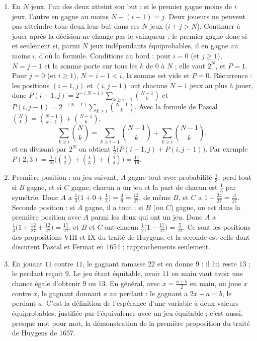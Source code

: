 \documentclass[11pt,a4paper]{article}
\begin{document}
\begin{solution}
\begin{enumerate}
\item En $N$ jeux, l'un des deux atteint son but : si le premier gagne moins de
  $i$ jeux, l'autre en gagne au moins $N - (i-1) = j$. Deux joueurs ne peuvent pas
  atteindre tous deux leur but dans ces $N$ jeux ($i + j > N$). Continuer à jouer
  après la décision ne change pas le vainqueur ; le premier gagne donc si et
  seulement si, parmi $N$ jeux indépendants équiprobables, il en gagne au moins
  $i$, d'où la formule. Conditions au bord : pour $i = 0$ (et $j \ge 1$),
  $N = j - 1$ et la somme porte sur tous les $k$ de $0$ à $N$ ; elle vaut $2^N$,
  et $P = 1$. Pour $j = 0$ (et $i \ge 1$), $N = i - 1 < i$, la somme est vide et
  $P = 0$. Récurrence : les positions $(i-1, j)$ et $(i, j-1)$ ont chacune
  $N - 1$ jeux au plus à jouer, donc
  $P(i-1,j) = 2^{-(N-1)}\sum_{k \ge i-1}\binom{N-1}{k}$ et
  $P(i,j-1) = 2^{-(N-1)}\sum_{k \ge i}\binom{N-1}{k}$. Avec la formule de Pascal
  $\binom{N}{k} = \binom{N-1}{k-1} + \binom{N-1}{k}$,
  \[
  \sum_{k \ge i}\binom{N}{k} = \sum_{k\ge i-1}\binom{N-1}{k} + \sum_{k \ge i}\binom{N-1}{k},
  \]
  et en divisant par $2^N$ on obtient $\frac12\bigl(P(i-1,j) + P(i,j-1)\bigr)$. Par
  exemple $P(2,3) = \frac{1}{16}\bigl(\binom42 + \binom43 + \binom44\bigr) =
  \frac{11}{16}$.
\item Première position : au jeu suivant, $A$ gagne tout avec probabilité
  $\frac13$, perd tout si $B$ gagne, et si $C$ gagne, chacun a un jeu et la part
  de chacun est $\frac13$ par symétrie. Donc $A$ a
  $\frac13\bigl(1 + 0 + \frac13\bigr) = \frac49 = \frac{12}{27}$, de même $B$, et
  $C$ a $1 - \frac{24}{27} = \frac{3}{27}$. Seconde position : si $A$ gagne, il a
  tout ; si $B$ (ou $C$) gagne, on est dans la première position avec $A$ parmi
  les deux qui ont un jeu. Donc $A$ a
  $\frac13\bigl(1 + \frac{12}{27} + \frac{12}{27}\bigr) = \frac{17}{27}$, et $B$
  et $C$ ont chacun $\frac12\bigl(1 - \frac{17}{27}\bigr) = \frac{5}{27}$. Ce
  sont les positions des propositions VIII et IX du traité de Huygens, et la
  seconde est celle dont discutent Pascal et Fermat en 1654 ; rapprochements
  seulement.
\item En jouant $11$ contre $11$, le gagnant ramasse $22$ et en donne $9$ : il lui
  reste $13$ ; le perdant reçoit $9$. Le jeu étant équitable, avoir $11$ en main
  vaut avoir une chance égale d'obtenir $9$ ou $13$. En général, avec
  $x = \frac{a+b}{2}$ en main, on joue $x$ contre $x$, le gagnant donnant $a$ au
  perdant : le gagnant a $2x - a = b$, le perdant $a$. C'est la définition de
  l'espérance d'une variable à deux valeurs équiprobables, justifiée par
  l'équivalence avec un jeu équitable ; c'est aussi, presque mot pour mot, la
  démonstration de la première proposition du traité de Huygens de 1657.
\end{enumerate}


\end{solution}
\end{document}

